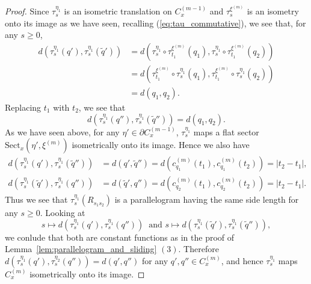 \documentclass[12pt]{amsart}
\numberwithin{equation}{section}
\theoremstyle{plain}
\theoremstyle{definition}
\theoremstyle{remark}
\newcommand{\xxi}[1]{\xi^{(#1)}}
\newcommand{\cc}[2]{c_{#1}^{#2}}
\newcommand{\trans}[2]{\tau_{#1}^{#2}}
\newcommand{\sect}[3][]{\mathrm{Sect}_{#1}(#2,#3)}
\newcommand{\cone}[2][]{C_{#1}^{(#2)}}
\begin{document}
\begin{proof}
\noindent
 Since $\trans{s}{\eta_1}$ is an isometric translation on
 $\cone[x]{m-1}$ and $\trans{s}{\xxi{m}}$ is an isometry onto its
 image as we have seen, recalling (\ref{eq:tau_commutative}), we
 see that, for any $s\geq 0$, 
\begin{equation*}
\begin{split}
  d(\trans{s}{\eta_1}(q'),\trans{s}{\eta_1}(\tilde q'))
 & = d(\trans{s}{\eta_1}\circ \trans{t_1}{\xxi{m}}(q_1),
    \trans{s}{\eta_1}\circ \trans{t_1}{\xxi{m}}(q_2)) \\
 & =d(\trans{t_1}{\xxi{m}}\circ \trans{s}{\eta_1}(q_1), 
  \trans{t_1}{\xxi{m}}\circ \trans{s}{\eta_1}(q_2)) \\
 & = d(q_1,q_2). 
\end{split}
\end{equation*}
 Replacing $t_1$ with $t_2$, we see that 
\begin{equation*}
 d(\trans{s}{\eta_1}(q''),\trans{s}{\eta_1}(\tilde q''))= 
 d(q_1,q_2). 
\end{equation*}
 As we have seen above, for any $\eta'\in\partial\cone[x]{m-1}$, 
 $\trans{s}{\eta_1}$ maps a flat sector $\sect[x]{\eta'}{\xxi{m}}$
 isometrically onto its image.
 Hence we also have 
\begin{equation*}
\begin{split}
  d(\trans{s}{\eta_1}(q'),\trans{s}{\eta_1}(\tilde q''))
 & = d(q',\tilde q'')=d(\cc{q_1}{(m)}(t_1),\cc{q_1}{(m)}(t_2))
   =|t_2-t_1|,  \\
  d(\trans{s}{\eta_1}(\tilde q'),\trans{s}{\eta_1}(q''))
 & = d(\tilde q',q'')
   =d(\cc{q_2}{(m)}(t_1),\cc{q_2}{(m)}(t_2))=|t_2-t_1|. 
\end{split}
\end{equation*}
 Thus we see that $\trans{s}{\eta_1}(R_{s_1s_2})$ is a
 parallelogram having the same side length for any $s\geq 0$. 
 Looking at 
\begin{equation*}
 s \mapsto d(\trans{s}{\eta_1}(q'),\trans{s}{\eta_1}(q'')) \
 \text{ and } 
 s \mapsto d(\trans{s}{\eta_1}(\tilde q'),
    \trans{s}{\eta_1}(\tilde q'')), 
\end{equation*}
 we conlude that both are constant functions as in the proof of 
 Lemma~\ref{lem:parallelogram_and_sliding} $(3)$. 
 Therefore 
 $d(\trans{s}{\eta_1}(q'), \trans{s}{\eta_2}(q''))=d(q',q'')$
 for any $q', q'' \in \cone[x]{m}$, and hence 
 $\trans{s}{\eta_1}$ maps $\cone[x]{m}$ isometrically onto its image. 


\end{proof}
\end{document}

